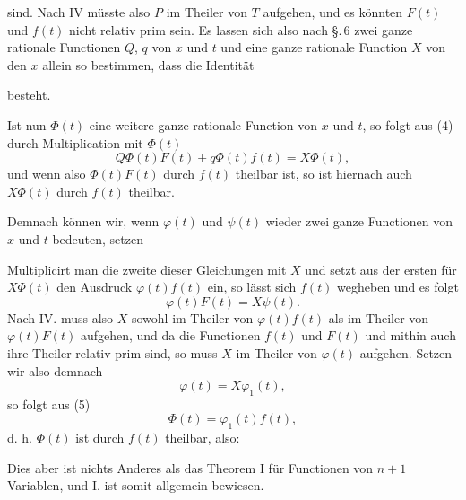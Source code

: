 
sind. Nach IV müsste also $P$ im Theiler von $T$ aufgehen, und
es könnten $F(t)$ und $f(t)$ nicht relativ prim sein. Es lassen
sich also nach \S.\,6 zwei ganze rationale Functionen $Q$, $q$ von $x$
und $t$ und eine ganze rationale Function $X$ von den $x$ allein so
bestimmen, dass die Identität

besteht.

Ist nun $\Phi(t)$ eine weitere ganze rationale Function von $x$
und $t$, so folgt aus (4) durch Multiplication mit $\Phi(t)$
\[
Q\Phi(t)F(t) + q\Phi(t)f(t) = X\Phi(t),
\]
und wenn also $\Phi(t)F(t)$ durch $f(t)$ theilbar ist, so ist hiernach
auch $X\Phi(t)$ durch $f(t)$ theilbar.

Demnach können wir, wenn $\varphi(t)$ und $\psi(t)$ wieder zwei ganze
Functionen von $x$ und $t$ bedeuten, setzen


Multiplicirt man die zweite dieser Gleichungen mit $X$ und
setzt aus der ersten für $X\Phi(t)$ den Ausdruck $\varphi(t)f(t)$ ein, so
lässt sich $f(t)$ wegheben und es folgt
\[
\varphi(t)F(t) = X\psi(t).
\]
Nach IV. muss also $X$ sowohl im Theiler von $\varphi(t)f(t)$ als
im Theiler von $\varphi(t)F(t)$ aufgehen, und da die Functionen $f(t)$
und $F(t)$ und mithin auch ihre Theiler relativ prim sind, so muss
$X$ im Theiler von $\varphi(t)$ aufgehen. Setzen wir also demnach
\[
\varphi(t) = X\varphi_1(t),
\]
so folgt aus (5)
\[
\Phi(t) = \varphi_1(t)f(t),
\]
d. h. $\Phi(t)$ ist durch $f(t)$ theilbar, also:


Dies aber ist nichts Anderes als das Theorem I für Functionen
von $n + 1$ Variablen, und I. ist somit allgemein bewiesen.
